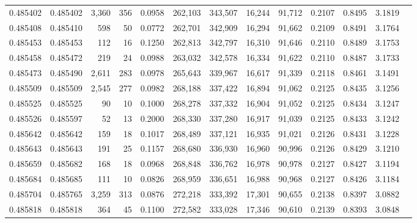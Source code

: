 \begin{tabular}{rrrrrrrrrrrrr}
0.485402 & 0.485402 & 3,360 &   356 &                                     0.0958 & 262,103 & 343,507 &  16,244 &  91,712 & 0.2107 & 0.8495 & 3.1819 \\
0.485408 & 0.485410 &   598 &    50 &                                     0.0772 & 262,701 & 342,909 &  16,294 &  91,662 & 0.2109 & 0.8491 & 3.1764 \\
0.485453 & 0.485453 &   112 &    16 &                                     0.1250 & 262,813 & 342,797 &  16,310 &  91,646 & 0.2110 & 0.8489 & 3.1753 \\
0.485458 & 0.485472 &   219 &    24 &                                     0.0988 & 263,032 & 342,578 &  16,334 &  91,622 & 0.2110 & 0.8487 & 3.1733 \\
0.485473 & 0.485490 & 2,611 &   283 &                                     0.0978 & 265,643 & 339,967 &  16,617 &  91,339 & 0.2118 & 0.8461 & 3.1491 \\
0.485509 & 0.485509 & 2,545 &   277 &                                     0.0982 & 268,188 & 337,422 &  16,894 &  91,062 & 0.2125 & 0.8435 & 3.1256 \\
0.485525 & 0.485525 &    90 &    10 &                                     0.1000 & 268,278 & 337,332 &  16,904 &  91,052 & 0.2125 & 0.8434 & 3.1247 \\
0.485526 & 0.485597 &    52 &    13 &                                     0.2000 & 268,330 & 337,280 &  16,917 &  91,039 & 0.2125 & 0.8433 & 3.1242 \\
0.485642 & 0.485642 &   159 &    18 &                                     0.1017 & 268,489 & 337,121 &  16,935 &  91,021 & 0.2126 & 0.8431 & 3.1228 \\
0.485643 & 0.485643 &   191 &    25 &                                     0.1157 & 268,680 & 336,930 &  16,960 &  90,996 & 0.2126 & 0.8429 & 3.1210 \\
0.485659 & 0.485682 &   168 &    18 &                                     0.0968 & 268,848 & 336,762 &  16,978 &  90,978 & 0.2127 & 0.8427 & 3.1194 \\
0.485684 & 0.485685 &   111 &    10 &                                     0.0826 & 268,959 & 336,651 &  16,988 &  90,968 & 0.2127 & 0.8426 & 3.1184 \\
0.485704 & 0.485765 & 3,259 &   313 &                                     0.0876 & 272,218 & 333,392 &  17,301 &  90,655 & 0.2138 & 0.8397 & 3.0882 \\
0.485818 & 0.485818 &   364 &    45 &                                     0.1100 & 272,582 & 333,028 &  17,346 &  90,610 & 0.2139 & 0.8393 & 3.0848 \\

\end{tabular}
